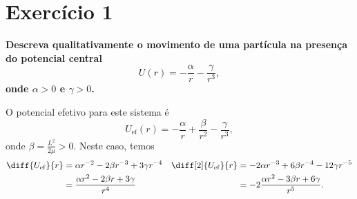 \section*{Exercício 1}
\textbf{Descreva qualitativamente o movimento de uma partícula na presença do potencial central}
\begin{equation*}
    U(r) = -\frac{\alpha}{r} - \frac{\gamma}{r^3},
\end{equation*}
\textbf{onde \(\alpha > 0\) e \(\gamma > 0\).}

O potencial efetivo para este sistema é
\begin{equation*}
    U_\mathrm{ef}(r) = -\frac{\alpha}{r} + \frac{\beta}{r^2} - \frac{\gamma}{r^3},
\end{equation*}
onde \(\beta = \frac{L^2}{2\mu} > 0\). Neste caso, temos
\begin{align*}
    \diff{U_\mathrm{ef}}{r} &= \alpha r^{-2} - 2 \beta r^{-3} + 3 \gamma r^{-4} &
    \diff[2]{U_\mathrm{ef}}{r} &= -2 \alpha r^{-3} + 6 \beta r^{-4} - 12 \gamma r^{-5}\\
                               &= \frac{\alpha r^2 - 2 \beta r + 3 \gamma}{r^4}&
                               &= -2\frac{\alpha r^2 -3 \beta r + 6 \gamma}{r^5}.
\end{align*}

